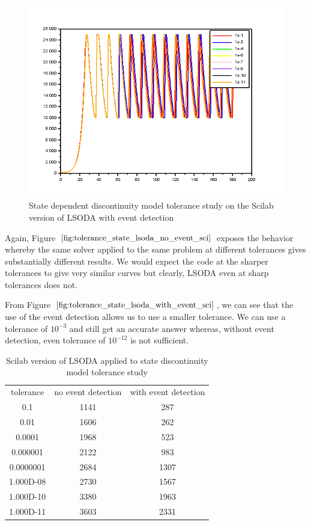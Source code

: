 \begin{figure}[h]
\centering
\includegraphics[width=0.7\linewidth]{./figures/tolerance_state_lsoda_with_event_sci}
\caption{State dependent discontinuity model tolerance study on the Scilab version of LSODA with event detection}
\label{fig:tolerance_state_lsoda_with_event_sci}
\end{figure}

Again, Figure $\ref{fig:tolerance_state_lsoda_no_event_sci}$ exposes the behavior whereby the same solver applied to the same problem at different tolerances gives substantially different results. We would expect the code at the sharper tolerances to give very similar curves but clearly, LSODA even at sharp tolerances does not.

From Figure $\ref{fig:tolerance_state_lsoda_with_event_sci}$, we can see that the use of the event detection allows us to use a smaller tolerance. We can use a tolerance of $10^{-3}$ and still get an accurate answer whereas, without event detection, even tolerance of $10^{-12}$ is not sufficient.

\begin{table}[h]
\caption {Scilab version of LSODA applied to state discontinuity model tolerance study} \label{tab:tolerance_state_discontinuity_lsoda_scilab} 
\begin{center}
\begin{tabular}{ c c c }
tolerance & no event detection & with event detection \\
0.1 & 1141 & 287 \\
0.01 & 1606 & 262 \\
0.0001 & 1968 & 523 \\
0.000001 & 2122 & 983 \\
0.0000001 & 2684 & 1307 \\
1.000D-08 & 2730 & 1567 \\
1.000D-10 & 3380 & 1963 \\
1.000D-11 & 3603 & 2331 \\
\end{tabular}
\end{center}
\end{table}

